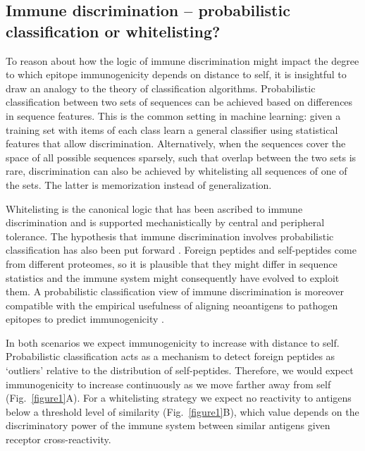 \documentclass[superscriptaddress,twocolumn,pre]{revtex4}
\newcommand{\<}{\langle}
\renewcommand{\>}{\rangle}
\begin{document}
\subsection{Immune discrimination -- probabilistic classification or whitelisting?}

To reason about how the logic of immune discrimination might impact the degree to which epitope immunogenicity depends on distance to self, it is insightful to draw an analogy to the theory of classification algorithms. Probabilistic classification between two sets of sequences can be achieved based on differences in sequence features. This is the common setting in machine learning: given a training set with items of each class learn a general classifier using statistical features that allow discrimination. Alternatively, when the sequences cover the space of all possible sequences sparsely, such that overlap between the two sets is rare, discrimination can also be achieved by whitelisting all sequences of one of the sets. The latter is memorization instead of generalization.

Whitelisting is the canonical logic that has been ascribed to immune discrimination and is supported mechanistically by central and peripheral tolerance. The hypothesis that immune discrimination involves probabilistic classification has also been put forward \cite{Wortel2020}. Foreign peptides and self-peptides come from different proteomes, so it is plausible that they might differ in sequence statistics and the immune system might consequently have evolved to exploit them. A probabilistic classification view of immune discrimination is moreover compatible with the empirical usefulness of aligning neoantigens to pathogen epitopes to predict immunogenicity \cite{Luksza2017,Richman2019}.

In both scenarios we expect immunogenicity to increase with distance to self. Probabilistic classification acts as a mechanism to detect foreign peptides as ‘outliers’ relative to the distribution of self-peptides. Therefore, we would expect immunogenicity to increase continuously as we move farther away from self (Fig.~\ref{figure1}A). For a whitelisting strategy we expect no reactivity to antigens below a threshold level of similarity (Fig.~\ref{figure1}B), which value depends on the discriminatory power of the immune system between similar antigens given receptor cross-reactivity.
\end{document}
